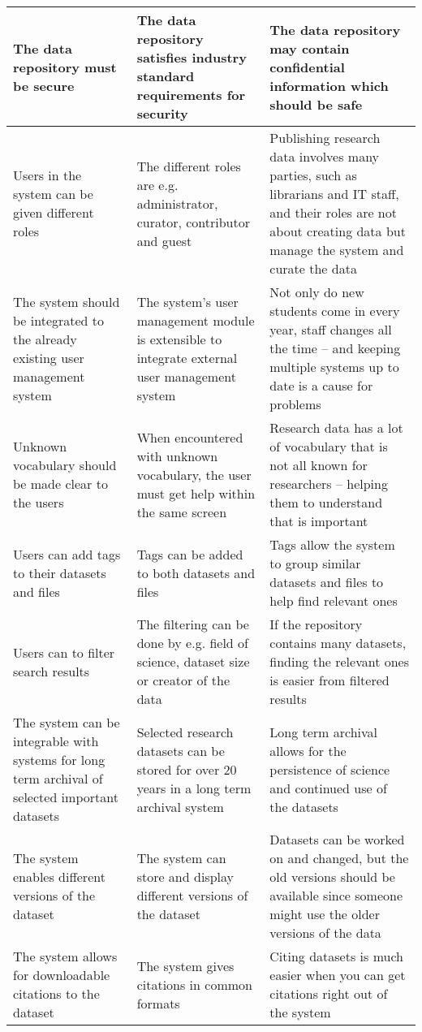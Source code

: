 \begin{tabularx}{\textwidth}{| >{\raggedright}p{3cm} | >{\raggedright}p{3cm} | X |}
    \hline
    \rowcolor{Gray}
    The data repository must be secure   &The data repository satisfies industry standard requirements for security& The data repository may contain confidential information which should be safe\\
    \hline
    Users in the system can be given different roles &The different roles are e.g. administrator, curator, contributor and guest & Publishing research data involves many parties, such as librarians and IT staff, and their roles are not about creating data but manage the system and curate the data\\
    \hline
    \rowcolor{Gray}
    The system should be integrated to the already existing user management system   &The system’s user management module is extensible to integrate external user management system & Not only do new students come in every year, staff changes all the time – and keeping multiple systems up to date is a cause for problems\\
    \hline
    Unknown vocabulary should be made clear to the users  &When encountered with unknown vocabulary, the user must get help within the same screen  & Research data has a lot of vocabulary that is not all known for researchers – helping them to understand that is important\\
    \hline
    \rowcolor{Gray}
    Users can add tags to their datasets and files        &Tags can be added to both datasets and files & Tags allow the system to group similar datasets and files to help find relevant ones\\
    \hline
    Users can to filter search results & The filtering can be done by e.g. field of science, dataset size or creator of the data& If the repository contains many datasets, finding the relevant ones is easier from filtered results\\
    \hline
    \rowcolor{Gray}
    The system can be integrable with systems for long term archival of selected important datasets  &Selected research datasets can be stored for over 20 years in a long term archival system& Long term archival allows for the persistence of science and continued use of the datasets\\
    \hline
    The system enables different versions of the dataset &The system can store and display different versions of the dataset & Datasets can be worked on and changed, but the old versions should be available since someone might use the older versions of the data\\
    \hline
    \rowcolor{Gray}
    The system allows for downloadable citations to the dataset   &The system gives citations in common formats & Citing datasets is much easier when you can get citations right out of the system\\
    \hline
\end{tabularx}
